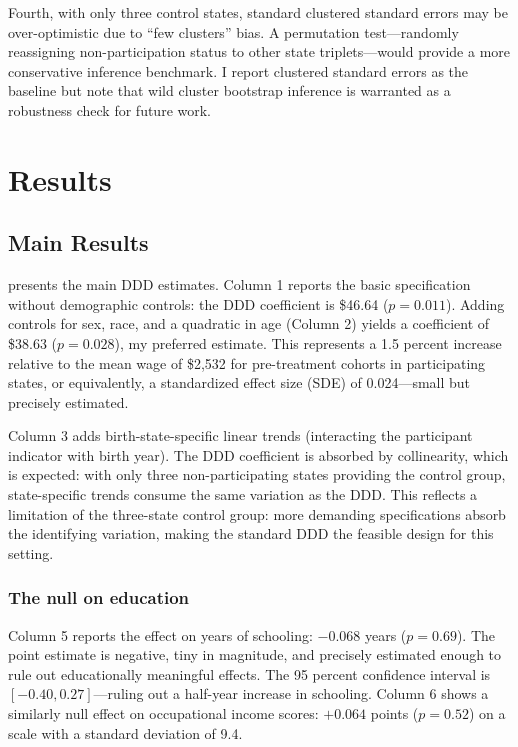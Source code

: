 \documentclass[12pt]{article}
\begin{document}
Fourth, with only three control states, standard clustered standard errors may be over-optimistic due to ``few clusters'' bias. A permutation test---randomly reassigning non-participation status to other state triplets---would provide a more conservative inference benchmark. I report clustered standard errors as the baseline but note that wild cluster bootstrap inference is warranted as a robustness check for future work.


\section{Results}

\subsection{Main Results}



 presents the main DDD estimates. Column 1 reports the basic specification without demographic controls: the DDD coefficient is \$46.64 ($p = 0.011$). Adding controls for sex, race, and a quadratic in age (Column 2) yields a coefficient of \$38.63 ($p = 0.028$), my preferred estimate. This represents a 1.5 percent increase relative to the mean wage of \$2,532 for pre-treatment cohorts in participating states, or equivalently, a standardized effect size (SDE) of 0.024---small but precisely estimated.

Column 3 adds birth-state-specific linear trends (interacting the participant indicator with birth year). The DDD coefficient is absorbed by collinearity, which is expected: with only three non-participating states providing the control group, state-specific trends consume the same variation as the DDD. This reflects a limitation of the three-state control group: more demanding specifications absorb the identifying variation, making the standard DDD the feasible design for this setting.

\subsubsection*{The null on education} Column 5 reports the effect on years of schooling: $-0.068$ years ($p = 0.69$). The point estimate is negative, tiny in magnitude, and precisely estimated enough to rule out educationally meaningful effects. The 95 percent confidence interval is $[-0.40, 0.27]$---ruling out a half-year increase in schooling. Column 6 shows a similarly null effect on occupational income scores: $+0.064$ points ($p = 0.52$) on a scale with a standard deviation of 9.4.
\end{document}
